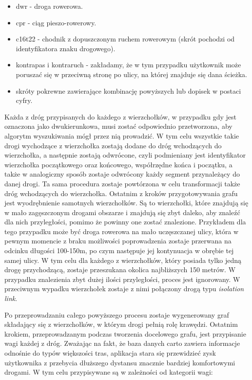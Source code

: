 \begin{itemize}
\item dwr - droga rowerowa.
\item cpr - ciąg pieszo-rowerowy.
\item c16t22 - chodnik z dopuszczonym ruchem rowerowym (skrót pochodzi od identyfikatora znaku drogowego).
\item kontrapas i kontraruch - zakładamy, że w tym przypadku użytkownik może poruszać się w przeciwną stronę po ulicy, na której znajduje się dana ścieżka.
\item skróty pokrewne zawierające kombinację powyższych lub dopisek w postaci cyfry.
\end{itemize}

Każda z dróg przypisanych do każdego z wierzchołków, w przypadku gdy jest oznaczona jako dwukierunkowa, musi zostać odpowiednio przetworzona, aby algorytm wyszukiwania mógł przez nią prowadzić. W tym celu wszystkie takie drogi wychodzące z wierzchołka zostają dodane do dróg wchodzących do wierzchołka, a następnie zostają odwrócone, czyli podmieniany jest identyfikator wierzchołka początkowego oraz końcowego, współrzędne końca i początku, a także w analogiczny sposób zostaje odwrócony każdy segment przynależący do danej drogi. Ta sama procedura zostaje powtórzona w celu transformacji także dróg wchodzących do wierzchołka.
Ostatnim z kroków przygotowywania grafu jest wyodrębnienie samotnych wierzchołków. Są to wierzchołki, które znajdują się w mało zagęszczonym drogami obszarze i znajdują się zbyt daleko, aby znaleźć dla nich przyległości, pomimo że powinny one zostać znalezione. Przykładem dla tego przypadku może być droga rowerowa na mało uczęszczanej ulicy, która w pewnym momencie z braku możliwości poprowadzenia zostaje przerwana na odcinku długości 100-150m, po czym następuje jej kontynuacja w obrębie tej samej ulicy. W tym celu dla każdego z wierzchołków, który posiada tylko jedną drogę przychodzącą, zostaje przeszukana okolica najbliższych 150 metrów. W przypadku znalezienia zbyt dużej ilości przyległości, proces jest ignorowany. W przeciwnym wypadku wierzchołek zostaje z nimi połączony drogą typu \textit{isolation link}. \newline

Po przeprowadzaniu całego powyższego procesu zostaje wygenerowany graf składający się z wierzchołków, w którym drogi pełnią rolę krawędzi. Ostatnim krokiem, przeprowadzanym podczas tworzenia docelowego grafu, jest przypisanie wagi każdej z dróg. Zważając na fakt, że baza danych carto zawiera informacje odnośnie do typów większości tras, aplikacja stara się przewidzieć zysk użytkownika z przebycia dłuższego dystansu znacznie bardziej komfortowymi drogami. W tym celu przypisywane są w zależności od kategorii wagi:

